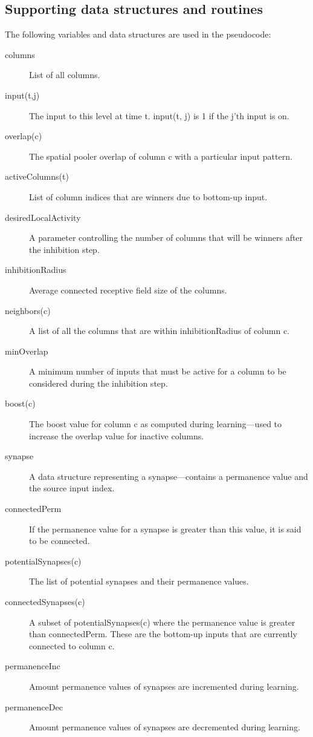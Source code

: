 \documentclass{report}
\begin{document}
\subsection*{Supporting data structures and routines}

The following variables and data structures are used in the pseudocode:

\begin{description}
\item[columns] List of all columns.
\item[input(t,j)] The input to this level at time t. input(t, j) is 1
  if the j'th input is on.
\item[overlap(c)] The spatial pooler overlap of column c with a
  particular input pattern.
\item[activeColumns(t)] List of column indices that are winners due to
  bottom-up input.
\item[desiredLocalActivity] A parameter controlling the number of
  columns that will be winners after the inhibition step.
\item[inhibitionRadius] Average connected receptive field size of the
  columns.
\item[neighbors(c)] A list of all the columns that are within
  inhibitionRadius of column c.
\item[minOverlap] A minimum number of inputs that must be active for a
  column to be considered during the inhibition step.
\item[boost(c)] The boost value for column c as computed during
  learning---used to increase the overlap value for inactive columns.
\item[synapse] A data structure representing a synapse---contains a
  permanence value and the source input index.
\item[connectedPerm] If the permanence value for a synapse is greater
  than this value, it is said to be connected.
\item[potentialSynapses(c)] The list of potential synapses and their
  permanence values.
\item[connectedSynapses(c)] A subset of potentialSynapses(c) where the
  permanence value is greater than connectedPerm. These are the
  bottom-up inputs that are currently connected to column c.
\item[permanenceInc] Amount permanence values of synapses are
  incremented during learning.
\item[permanenceDec] Amount permanence values of synapses are
  decremented during learning.

\end{description}
\end{document}
